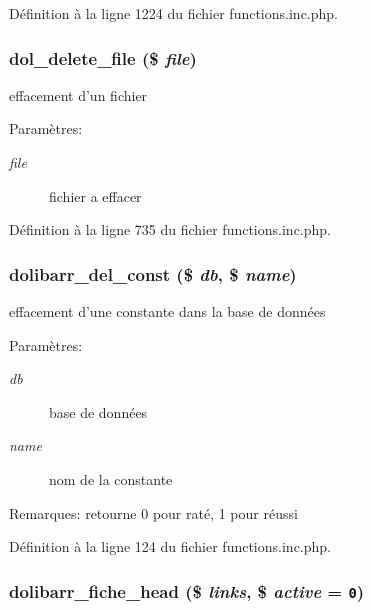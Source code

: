 D\'{e}finition \`{a} la ligne 1224 du fichier functions.inc.php.\hypertarget{functions_8inc_8php_a30}{
\subsubsection[dol\_\-delete\_\-file]{\setlength{\rightskip}{0pt plus 5cm}dol\_\-delete\_\-file (\$ {\em file})}}
\label{functions_8inc_8php_a30}


effacement d'un fichier 

\begin{Desc}
\item[Param\`{e}tres:]
\begin{description}
\item[{\em file}]fichier a effacer \end{description}
\end{Desc}


D\'{e}finition \`{a} la ligne 735 du fichier functions.inc.php.\hypertarget{functions_8inc_8php_a4}{
\subsubsection[dolibarr\_\-del\_\-const]{\setlength{\rightskip}{0pt plus 5cm}dolibarr\_\-del\_\-const (\$ {\em db}, \$ {\em name})}}
\label{functions_8inc_8php_a4}


effacement d'une constante dans la base de donn\'{e}es 

\begin{Desc}
\item[Param\`{e}tres:]
\begin{description}
\item[{\em db}]base de donn\'{e}es \item[{\em name}]nom de la constante \end{description}
\end{Desc}
\begin{Desc}
\item[Remarques:]retourne 0 pour rat\'{e}, 1 pour r\'{e}ussi \end{Desc}


D\'{e}finition \`{a} la ligne 124 du fichier functions.inc.php.\hypertarget{functions_8inc_8php_a2}{
\subsubsection[dolibarr\_\-fiche\_\-head]{\setlength{\rightskip}{0pt plus 5cm}dolibarr\_\-fiche\_\-head (\$ {\em links}, \$ {\em active} = {\tt 0})}}
\label{functions_8inc_8php_a2}


